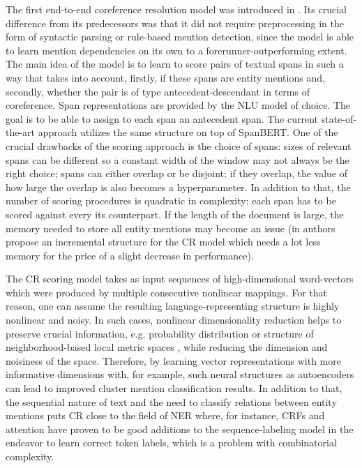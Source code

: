 The first end-to-end coreference resolution model was introduced in \cite{cr-Lee17}. Its crucial difference from its predecessors was that it did not require preprocessing in the form of syntactic parsing or rule-based mention detection, since the model is able to learn mention dependencies on its own to a forerunner-outperforming extent. 
The main idea of the model is to learn to score pairs of textual spans in such a way that takes into account, firstly, if these spans are entity mentions and, secondly, whether the pair is of type antecedent-descendant in terms of coreference.
Span representations are provided by the NLU model of choice. 
The goal is to be able to assign to each span an antecedent span. The current state-of-the-art approach \cite{cr-Joshi2019} utilizes the same structure on top of SpanBERT. One of the crucial drawbacks of the scoring approach is the choice of spans: sizes of relevant spans can be different so a constant width of the window may not always be the right choice; spans can either overlap or be disjoint; if they overlap, the value of how large the overlap is also becomes a hyperparameter. In addition to that, the number of scoring procedures is quadratic in complexity: each span has to be scored against every its counterpart. If the length of the document is large, the memory needed to store all entity mentions may become an issue (in \cite{cr-Xia2020} authors propose an incremental structure for the CR model which needs a lot less memory for the price of a slight decrease in performance). 

The CR scoring model takes as input sequences of high-dimensional word-vectors which were produced by multiple consecutive nonlinear mappings. For that reason, one can assume the resulting language-representing structure is highly nonlinear and noisy. 
In such cases, nonlinear dimensionality reduction helps to preserve crucial information, e.g. probability distribution \cite{dr-VanderMaaten2014} or structure of neighborhood-based local metric spaces \cite{dr-McInnes2018}, while reducing the dimension and noisiness of the space. 
Therefore, by learning vector representations with more informative dimensions with, for example, such neural structures as autoencoders \cite{autoencoders-Zabalza2016,autoencoders-Sahay2019} can lead to improved cluster mention classification results. 
In addition to that, the sequential nature of text and the need to classify relations between entity mentions puts CR close to the field of NER where, for instance, CRFs \cite{ner-Strakova2019,ner-Zhanming2019} and attention \cite{ner-Yamada2020} have proven to be good additions  to the sequence-labeling model in the endeavor to learn correct token labels, which is a problem with combinatorial complexity. 

